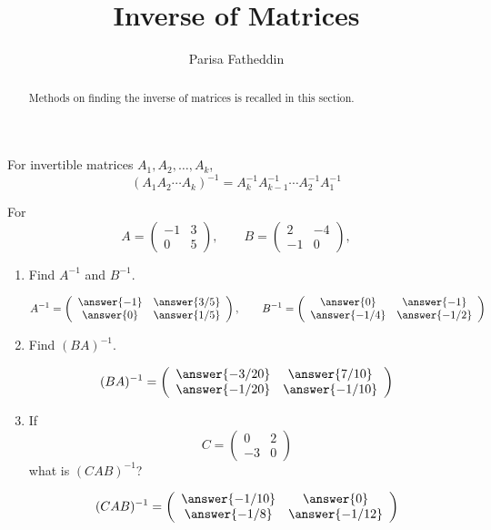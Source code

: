 \documentclass{ximera}
\author{Parisa Fatheddin}
\title{Inverse of Matrices}
\begin{document}
\begin{abstract}
Methods on finding the inverse of matrices is recalled in this section. 
\end{abstract}
\maketitle
\begin{center}
\end{center}

\begin{exercise}
\begin{hint}
For invertible matrices $A_{1}, A_{2},\dots,A_{k}$,
\[
\left(A_{1}A_{2}\cdots A_{k}\right)^{-1} = A_{k}^{-1} A_{k-1}^{-1}\cdots A_{2}^{-1} A_{1}^{-1}
\]
\end{hint}
For
\[ A= \left(\begin{array}{cc}
  -1 & 3   \\
  0 &  5
\end{array}\right), \qquad B= \left(\begin{array}{cc}
  2 & -4   \\
  -1 &  0
\end{array}\right),
\]
\begin{enumerate}
\item Find $A^{-1}$ and $B^{-1}$.

\begin{prompt}
\[ A^{-1}= \left(\begin{array}{cc}
  \answer{-1} & \answer{3/5}   \\
  \answer{0} & \answer{1/5}
\end{array}\right), \qquad B^{-1}= \left(\begin{array}{cc}
  \answer{0} & \answer{-1}   \\
  \answer{-1/4} & \answer{-1/2}
\end{array}\right)\]
\end{prompt}

\item Find $(BA)^{-1}$.

\begin{prompt}
\[(BA)^{-1} = \left(\begin{array}{cc}
  \answer{-3/20} & \answer{7/10}   \\
  \answer{-1/20} & \answer{-1/10}
\end{array}\right)
\]
\end{prompt}

\item If
\[C = \left(\begin{array}{cc}
  0&2\\
  -3&0
\end{array}\right)
\]
what is $(CAB)^{-1}$?

\begin{prompt}
\[(CAB)^{-1}= \left(\begin{array}{cc}
  \answer{-1/10} & \answer{0}   \\
  \answer{-1/8} & \answer{-1/12}
\end{array}\right)
\]
\end{prompt}
\end{enumerate}
\end{exercise}
\end{document}

